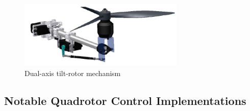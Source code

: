 \begin{figure}[htbp]
\centering
\includegraphics[width=0.7\textwidth]{figs/gasco-mech}
\caption{Dual-axis tilt-rotor mechanism}
\label{fig:tiltrotor-gasco}
\end{figure}
\subsection{Notable Quadrotor Control Implementations}
\label{subsec:intro.lit.control}
